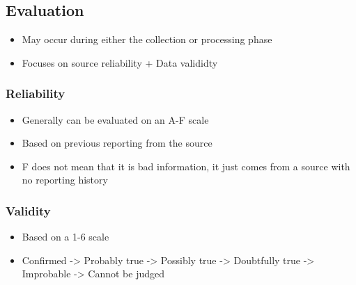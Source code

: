 \documentclass[11pt]{article}
\begin{document}
\subsection{Evaluation}
\label{sec:org0116281}
\begin{itemize}
\item May occur during either the collection or processing phase
\item Focuses on source reliability + Data valididty
\end{itemize}
\subsubsection{Reliability}
\label{sec:org62f35f6}
\begin{itemize}
\item Generally can be evaluated on an A-F scale
\item Based on previous reporting from the source
\item F does not mean that it is bad information, it just comes from a source with no reporting history
\end{itemize}
\subsubsection{Validity}
\label{sec:orgd567d08}
\begin{itemize}
\item Based on a 1-6 scale
\item Confirmed -> Probably true -> Possibly true -> Doubtfully true -> Improbable -> Cannot be judged
\end{itemize}
\end{document}
